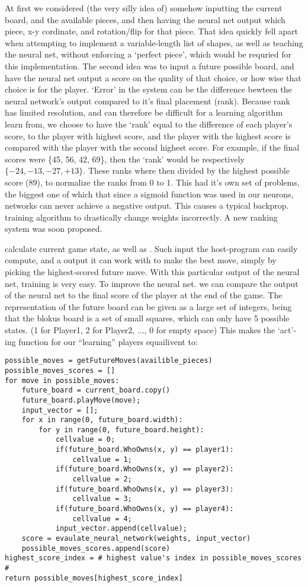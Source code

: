 \documentclass{report}
\begin{document}
	At first we considered (the very silly idea of) somehow inputting the current board, and the available pieces, and then having the neural net output which piece, x-y cordinate,
	and rotation/flip for that piece. That idea quickly fell apart when attempting to implement a variable-length list of shapes, as well as teaching the neural net, without enforcing a `perfect
	piece', which would be requried for this implementation.
	The second idea was to input a future possible board, and have the neural net output a score on the quality of that choice, or how wise that choice is for the player.
	`Error' in the system can be the difference bewteen the neural network's output compared to it's final placement (rank). Because rank has limited resolution, and can therefore be difficult
	for a learning algorithm learn from, we choose to have the `rank' equal to the difference of each player's score, to the player with highest score, and the player with the highest score is
	compared with the player with the second highest score. For example, if the final scores were \{45, 56, 42, 69\}, then the `rank' would be respectively $\{-24, -13, -27,+13\}$. These ranks
	where then divided by the highest possible score (89), to normalize the ranks from 0 to 1. This had it's own set of problems, the biggest one of which that since a sigmoid function was
	used in our neurons, networks can never achieve a negative output. This causes a typical backprop. training algorithm to drastically change weights incorrectly. A new ranking system was soon
	proposed. 

	calculate current game state, as well as . Such input the host-program can easily
	compute, and a output it can work with to make the best move, simply by picking the highest-scored future move. With this particular output of the neural net, training is very easy. To
	improve the neural net. we can compare the output of the neural net to the final score of the player at the end of the game. The representation of the future board can be given as a large set of
	integers, being that the blokus board is a set of small squares, which can only have 5 possible states. (1 for Player1, 2 for Player2, ..., 0 for empty space) This makes the `act'-ing
	function for our ``learning'' players equailivent to:
	\lstset{language=Python}
	\lstset{basicstyle=\footnotesize}
	\begin{lstlisting}
possible_moves = getFutureMoves(availible_pieces)
possible_moves_scores = []
for move in possible_moves:
	future_board = current_board.copy()
	future_board.playMove(move);
	input_vector = [];
	for x in range(0, future_board.width):
		for y in range(0, future_board.height):
			cellvalue = 0;
			if(future_board.WhoOwns(x, y) == player1):
				cellvalue = 1;
			if(future_board.WhoOwns(x, y) == player2):
				cellvalue = 2;
			if(future_board.WhoOwns(x, y) == player3):
				cellvalue = 3;
			if(future_board.WhoOwns(x, y) == player4):
				cellvalue = 4;
			input_vector.append(cellvalue);
	score = evaulate_neural_network(weights, input_vector)
	possible_moves_scores.append(score)
highest_score_index = # highest value's index in possible_moves_scores #
return possible_moves[highest_score_index]
	\end{lstlisting}
	
\end{document}
